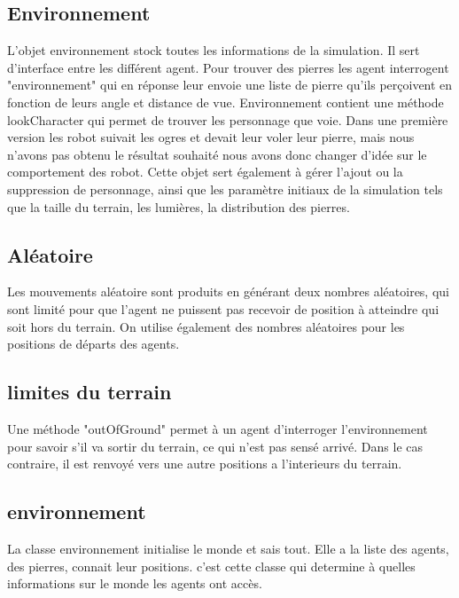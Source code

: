 \subsection{Environnement}
L'objet environnement stock toutes les informations de la simulation. Il sert d'interface entre les différent agent. Pour trouver des pierres les agent interrogent "environnement" qui en réponse leur envoie une liste de pierre qu'ils perçoivent en fonction de leurs angle et distance de vue. Environnement contient une méthode lookCharacter qui permet de trouver les personnage que voie. Dans une première version les robot suivait les ogres et devait leur voler leur pierre, mais nous n'avons pas obtenu le résultat souhaité nous avons donc changer d'idée sur le comportement des robot.
Cette objet sert également à gérer l'ajout ou la suppression de personnage, ainsi que les paramètre initiaux de la simulation tels que la taille du terrain, les lumières, la distribution des pierres. 
\subsection{Aléatoire}
Les mouvements aléatoire sont produits en générant deux nombres
aléatoires, qui sont limité pour que l'agent ne puissent pas recevoir
de position à atteindre qui soit hors du terrain.  On utilise
également des nombres aléatoires pour les positions de départs des
agents.

\subsection{limites du terrain}

Une méthode "outOfGround" permet à un agent d'interroger
l'environnement pour savoir s'il va sortir du terrain, ce qui n'est
pas sensé arrivé. Dans le cas contraire, il est renvoyé vers une autre
positions a l'interieurs du terrain.

\subsection{environnement}
La classe environnement initialise le monde et sais tout. Elle a la liste des 
agents, des pierres, connait leur positions. c'est cette classe qui determine à quelles informations sur le monde les agents ont accès.
